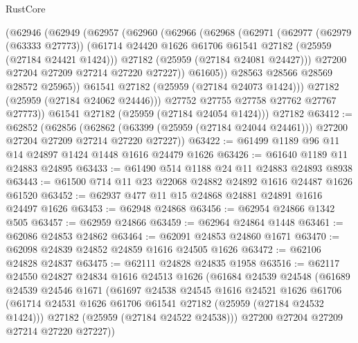 \begin{lexlean}{RustCore}
\begin{coremodule}
            (@62946
              (@62949
                (@62957
                  (@62960
                    (@62966
                      (@62968
                        (@62971
                          (@62977
                            (@62979 (@63333 @27773))
                            (@61714
                              @24420
                              @1626
                              @61706
                              @61541
                              @27182
                              (@25959 (@27184 @24421 @1424)))
                            @27182
                            (@25959 (@27184 @24081 @24427)))
                          @27200
                          @27204
                          @27209
                          @27214
                          @27220
                          @27227))
                      @61605))
                  @28563
                  @28566
                  @28569
                  @28572
                  @25965))
              @61541
              @27182
              (@25959 (@27184 @24073 @1424)))
            @27182
            (@25959 (@27184 @24062 @24446)))
          @27752
          @27755
          @27758
          @27762
          @27767
          @27773))
      @61541
      @27182
      (@25959 (@27184 @24054 @1424)))
    @27182
@63412 := @62852
    (@62856
      (@62862 (@63399 (@25959 (@27184 @24044 @24461))) @27200 @27204 @27209 @27214 @27220 @27227))
@63422 := @61499 @1189 @96 @11 @14 @24897 @1424 @1448 @1616 @24479 @1626
@63426 := @61640 @1189 @11 @24883 @24895
@63433 := @61490 @514 @1188 @24 @11 @24883 @24893 @8938
@63443 := @61500 @714 @11 @23 @22068 @24882 @24892 @1616 @24487 @1626 @61520
@63452 := @62937 @477 @11 @15 @24868 @24881 @24891 @1616 @24497 @1626
@63453 := @62948 @24868
@63456 := @62954 @24866 @1342 @505
@63457 := @62959 @24866
@63459 := @62964 @24864 @1448
@63461 := @62086 @24853 @24862
@63464 := @62091 @24853 @24860 @1671
@63470 := @62098 @24839 @24852 @24859 @1616 @24505 @1626
@63472 := @62106 @24828 @24837
@63475 := @62111 @24828 @24835 @1958
@63516 := @62117
    @24550
    @24827
    @24834
    @1616
    @24513
    @1626
    (@61684
      @24539
      @24548
      (@61689
        @24539
        @24546
        @1671
        (@61697
          @24538
          @24545
          @1616
          @24521
          @1626
          @61706
          (@61714 @24531 @1626 @61706 @61541 @27182 (@25959 (@27184 @24532 @1424)))
          @27182
          (@25959 (@27184 @24522 @24538)))
        @27200
        @27204
        @27209
        @27214
        @27220
        @27227))

\end{coremodule}
\end{lexlean}

